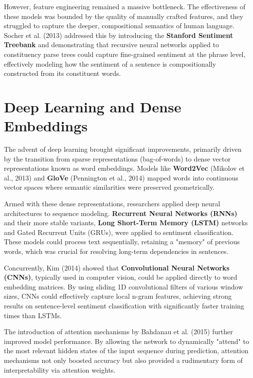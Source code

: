 \documentclass[12pt, a4paper]{report}
\begin{document}
However, feature engineering remained a massive bottleneck. The effectiveness of these models was bounded by the quality of manually crafted features, and they struggled to capture the deeper, compositional semantics of human language. Socher et al. (2013) addressed this by introducing the \textbf{Stanford Sentiment Treebank} and demonstrating that recursive neural networks applied to constituency parse trees could capture fine-grained sentiment at the phrase level, effectively modeling how the sentiment of a sentence is compositionally constructed from its constituent words.

\section{Deep Learning and Dense Embeddings}

The advent of deep learning brought significant improvements, primarily driven by the transition from sparse representations (bag-of-words) to dense vector representations known as word embeddings. Models like \textbf{Word2Vec} (Mikolov et al., 2013) and \textbf{GloVe} (Pennington et al., 2014) mapped words into continuous vector spaces where semantic similarities were preserved geometrically.

Armed with these dense representations, researchers applied deep neural architectures to sequence modeling. \textbf{Recurrent Neural Networks (RNNs)} and their more stable variants, \textbf{Long Short-Term Memory (LSTM)} networks and Gated Recurrent Units (GRUs), were applied to sentiment classification. These models could process text sequentially, retaining a "memory" of previous words, which was crucial for resolving long-term dependencies in sentences. 

Concurrently, Kim (2014) showed that \textbf{Convolutional Neural Networks (CNNs)}, typically used in computer vision, could be applied directly to word embedding matrices. By using sliding 1D convolutional filters of various window sizes, CNNs could effectively capture local n-gram features, achieving strong results on sentence-level sentiment classification with significantly faster training times than LSTMs.

The introduction of attention mechanisms by Bahdanau et al. (2015) further improved model performance. By allowing the network to dynamically "attend" to the most relevant hidden states of the input sequence during prediction, attention mechanisms not only boosted accuracy but also provided a rudimentary form of interpretability via attention weights.
\end{document}

